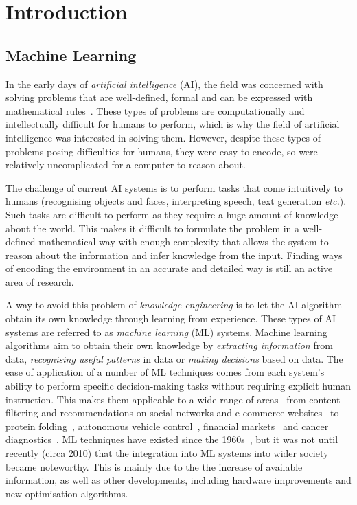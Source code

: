 \chapter{Introduction}
\justifying
\setlength{\parindent}{0em}

\section{Machine Learning}
In the early days of \textit{artificial intelligence} (AI), the field was concerned with solving problems that are well-defined, formal and can be expressed with mathematical rules~\cite{bernstein1958computer, minsky1956heuristic, minsky1962problems}. These types of problems are computationally and intellectually difficult for humans to perform, which is why the field of artificial intelligence was interested in solving them. However, despite these types of problems posing difficulties for humans, they were easy to encode, so were relatively uncomplicated for a computer to reason about.

The challenge of current AI systems is to perform tasks that come intuitively to humans (\eg recognising objects and faces, interpreting speech, text generation \textit{etc.}). Such tasks are difficult to perform as they require a huge amount of knowledge about the world. This makes it difficult to formulate the problem in a well-defined mathematical way with enough complexity that allows the system to reason about the information and infer knowledge from the input. Finding ways of encoding the environment in an accurate and detailed way is still an active area of research. 

A way to avoid this problem of \textit{knowledge engineering} is to let the AI algorithm obtain its own knowledge through learning from experience. These types of AI systems are referred to as \textit{machine learning} (ML) systems. Machine learning algorithms aim to obtain their own knowledge by \textit{extracting information} from data, \textit{recognising useful patterns} in data or \textit{making decisions} based on data. The ease of application of a number of ML techniques comes from each system's ability to perform specific decision-making tasks without requiring explicit human instruction. This makes them applicable to a wide range of areas~\cite{forthcoming} from content filtering and recommendations on social networks and e-commerce websites~\cite{de2010combining} to protein folding~\cite{varadi2022alphafold}, autonomous vehicle control~\cite{kuutti2020survey}, financial markets~\cite{cavalcante2016computational} and cancer diagnostics~\cite{huang2020artificial}. ML techniques have existed since the 1960s~\cite{minsky1969introduction, samuel1959some, nilsson1965learning}, but it was not until recently (circa 2010) that the integration into ML systems into wider society became noteworthy. This is mainly due to the the increase of available information, as well as other developments, including hardware improvements and new optimisation algorithms.  
